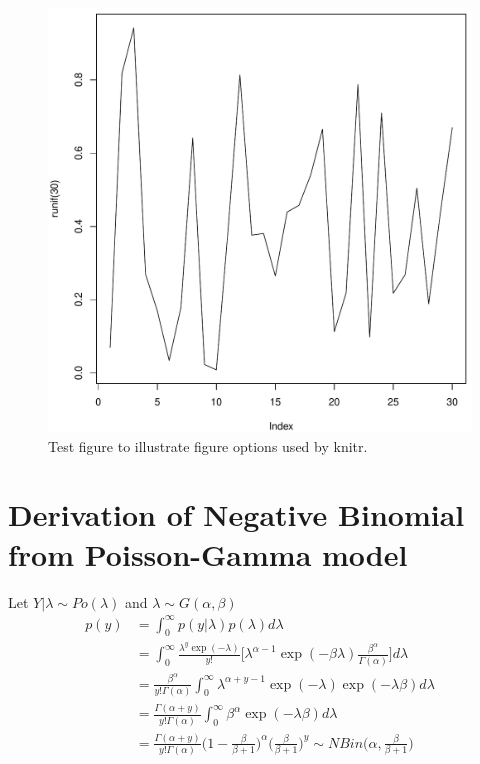 \begin{figure}
\begin{knitrout}
\color{fgcolor}

{\centering \includegraphics[width=\textwidth-3cm]{figure/ch02_figunnamed-chunk-5-1} 

}


\end{knitrout}
  \caption{Test figure to illustrate figure options used by knitr.}
  \label{f02:1}
\end{figure}

\newpage
\section{Derivation of Negative Binomial from Poisson-Gamma model}

Let $Y|\lambda \sim Po(\lambda)$ and $\lambda \sim G(\alpha,\beta)$
\begin{align*}
p(y)&=\int^\infty_0 p(y|\lambda) p(\lambda) d\lambda\\
&=\int^\infty_0 \frac{\lambda^y\exp(-\lambda)}{y!}\Bigg[\lambda^{\alpha-1}\exp(-\beta\lambda)\frac{\beta^\alpha}{\Gamma(\alpha)}\Bigg]d\lambda\\
&=\frac{\beta^\alpha}{y!\Gamma(\alpha)}\int^\infty_0 \lambda^{\alpha+y-1}\exp(-\lambda)\exp(-\lambda\beta)d\lambda\\
&=\frac{\Gamma(\alpha+y)}{y!\Gamma(\alpha)}\int^\infty_0 \beta^\alpha \exp(-\lambda\beta)d\lambda\\
&=\frac{\Gamma(\alpha+y)}{y!\Gamma(\alpha)}\Bigg(1-\frac{\beta}{\beta+1}\Bigg)^{\alpha}\Bigg(\frac{\beta}{\beta+1}\Bigg)^y \sim NBin \Bigg(\alpha, \frac{\beta}{\beta+1}\Bigg)
\end{align*}



